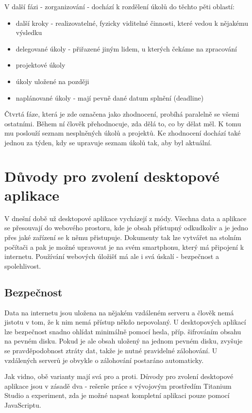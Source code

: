 V další fázi - zorganizování - dochází k rozdělení úkolů do těchto pěti oblastí:

\begin{itemize}
\item další kroky - realizovatelné, fyzicky viditelné činnosti, které vedou k nějakému výsledku
\item delegované úkoly - přiřazené jiným lidem, u kterých čekáme na zpracování
\item projektové úkoly
\item úkoly uložené na později
\item naplánované úkoly - mají pevně dané datum splnění (deadline)
\end{itemize}

Čtvrtá fáze, která je zde označena jako zhodnocení, probíhá paralelně se všemi ostatními. Během ní člověk přehodnocuje, zda dělá to, co by dělat měl. K tomu mu poslouží seznam nesplněných úkolů a projektů. Ke zhodnocení dochází také jednou za týden, kdy se upravuje seznam úkolů tak, aby byl aktuální.

\section{Důvody pro zvolení desktopové aplikace}

V dnešní době už desktopové aplikace vycházejí z módy. Všechna data a aplikace se přesouvají do webového prostoru, kde je obsah přístupný odkudkoliv a je jedno přes jaké zařízení se k němu přistupuje. Dokumenty tak lze vytvářet na stolním počítači a pak je možné upravovat je na svém smartphonu, který má připojení k internetu. Používání webových úložišť má ale i svá úskalí - bezpečnost a spolehlivost.

\subsection{Bezpečnost}

Data na internetu jsou uložena na nějakém vzdáleném serveru a člověk nemá jistotu v tom, že k nim nemá přístup někdo nepovolaný. U desktopových aplikací lze bezpečnost snadno ohlídat minimálně pomocí hesla, příp. šifrováním obsahu na pevném disku. Pokud je ale obsah uložený na jednom pevném disku, zvyšuje se pravděpodobnost ztráty dat, takže je nutné pravidelné zálohování. U vzdálených serverů je obvykle o zálohování postaráno automaticky.

Jak vidno, obě varianty mají svá pro a proti. Důvody pro zvolení desktopové aplikace jsou v zásadě dva - rešerše práce s vývojovým prostředím Titanium Studio a experiment, zda je možné napsat kompletní aplikaci pouze pomocí JavaScriptu. 

